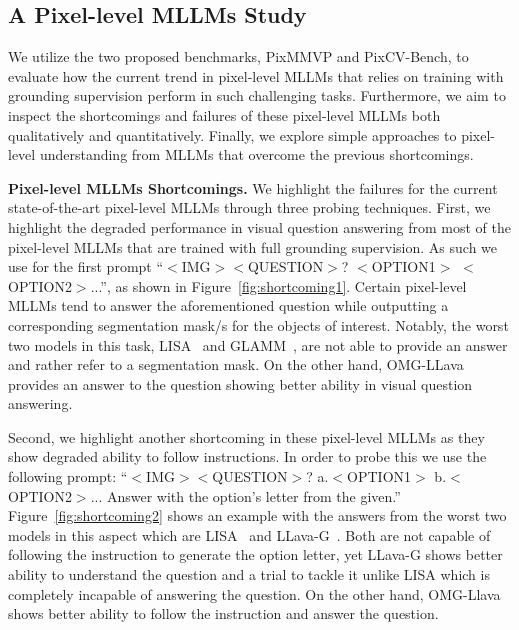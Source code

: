 \subsection{A Pixel-level MLLMs Study}

We utilize the two proposed benchmarks, PixMMVP and PixCV-Bench, to evaluate how the current trend in pixel-level MLLMs that relies on training with grounding supervision perform in such challenging tasks. Furthermore, we aim to inspect the shortcomings and failures of these pixel-level MLLMs both qualitatively and quantitatively. Finally, we explore simple approaches to pixel-level understanding from MLLMs that overcome the previous shortcomings. %

\textbf{Pixel-level MLLMs Shortcomings.} We highlight the failures for the current state-of-the-art pixel-level MLLMs through three probing techniques. First, we highlight the degraded performance in visual question answering from most of the pixel-level MLLMs that are trained with full grounding supervision. As such we use for the first prompt ``$<$IMG$>$$<$QUESTION$>$? $<$OPTION1$>$ $<$OPTION2$>$...'', as shown in Figure~\ref{fig:shortcoming1}. Certain pixel-level MLLMs tend to answer the aforementioned question while outputting a corresponding segmentation mask/s for the objects of interest. Notably, the worst two models in this task, LISA~\cite{lai2024lisa} and GLAMM~\cite{rasheed2024glamm}, are not able to provide an answer and rather refer to a segmentation mask. On the other hand, OMG-LLava~\cite{zhang2024omg} provides an answer to the question showing better ability in visual question answering.%

Second, we highlight another shortcoming in these pixel-level MLLMs as they show degraded ability to follow instructions. In order to probe this we use the following prompt: ``$<$IMG$>$$<$QUESTION$>$? a.$<$OPTION1$>$ b.$<$OPTION2$>$... Answer with the option's letter from the given.'' Figure~\ref{fig:shortcoming2} shows an example with the answers from the worst two models in this aspect which are LISA~\cite{lai2024lisa} and LLava-G~\cite{zhang2025llava}. Both are not capable of following the instruction to generate the option letter, yet LLava-G shows better ability to understand the question and a trial to tackle it unlike LISA which is completely incapable of answering the question. On the other hand, OMG-Llava shows better ability to follow the instruction and answer the question. 

